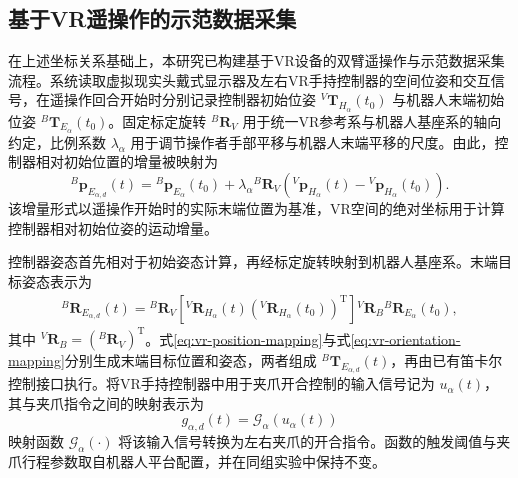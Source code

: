 \subsection{基于VR遥操作的示范数据采集}

在上述坐标关系基础上，本研究已构建基于VR设备的双臂遥操作与示范数据采集流程。系统读取虚拟现实头戴式显示器及左右VR手持控制器的空间位姿和交互信号，在遥操作回合开始时分别记录控制器初始位姿
\({}^{V}\mathbf T_{H_\alpha}(t_0)\) 与机器人末端初始位姿
\({}^{B}\mathbf T_{E_\alpha}(t_0)\)。固定标定旋转
\({}^{B}\mathbf R_V\) 用于统一VR参考系与机器人基座系的轴向约定，比例系数 \(\lambda_\alpha\) 用于调节操作者手部平移与机器人末端平移的尺度。由此，控制器相对初始位置的增量被映射为
\begin{equation}
  {}^{B}\mathbf p_{E_{\alpha,d}}(t)
  =
  {}^{B}\mathbf p_{E_\alpha}(t_0)
  +
  \lambda_\alpha{}^{B}\mathbf R_V
  \left(
    {}^{V}\mathbf p_{H_\alpha}(t)
    -
    {}^{V}\mathbf p_{H_\alpha}(t_0)
  \right).
  \label{eq:vr-position-mapping}
\end{equation}
该增量形式以遥操作开始时的实际末端位置为基准，VR空间的绝对坐标用于计算控制器相对初始位姿的运动增量。

控制器姿态首先相对于初始姿态计算，再经标定旋转映射到机器人基座系。末端目标姿态表示为
\begin{equation}
  \begin{aligned}
    {}^{B}\mathbf R_{E_{\alpha,d}}(t)
    ={}^{B}\mathbf R_V
    \left[
      {}^{V}\mathbf R_{H_\alpha}(t)
      \left({}^{V}\mathbf R_{H_\alpha}(t_0)\right)^{\mathrm T}
    \right]
    {}^{V}\mathbf R_B
    {}^{B}\mathbf R_{E_\alpha}(t_0),
  \end{aligned}
  \label{eq:vr-orientation-mapping}
\end{equation}
其中 \({}^{V}\mathbf R_B=\left({}^{B}\mathbf R_V\right)^{\mathrm T}\)。式\eqref{eq:vr-position-mapping}与式\eqref{eq:vr-orientation-mapping}分别生成末端目标位置和姿态，两者组成
\({}^{B}\mathbf T_{E_{\alpha,d}}(t)\)，再由已有笛卡尔控制接口执行。将VR手持控制器中用于夹爪开合控制的输入信号记为 \(u_\alpha(t)\)，其与夹爪指令之间的映射表示为
\begin{equation}
  g_{\alpha,d}(t)=\mathcal G_\alpha\!\left(u_\alpha(t)\right)
  \label{eq:gripper-mapping}
\end{equation}
映射函数 \(\mathcal G_\alpha(\cdot)\) 将该输入信号转换为左右夹爪的开合指令。函数的触发阈值与夹爪行程参数取自机器人平台配置，并在同组实验中保持不变。

